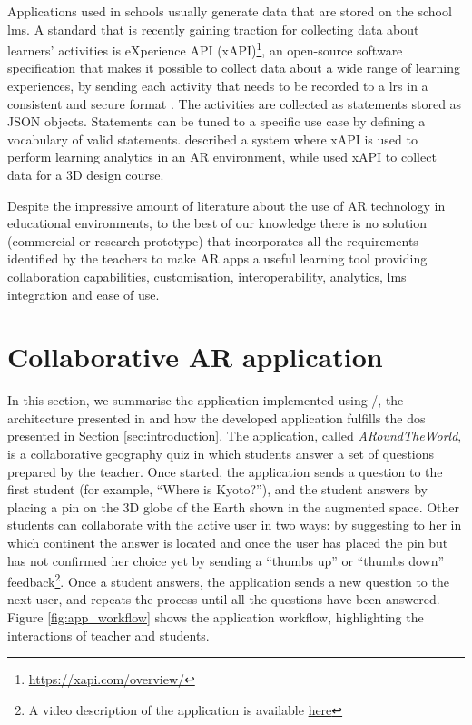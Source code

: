 \documentclass[pdflatex,sn-basic,iicol]{sn-jnl}%
\def\appname/{\textit{ARoundTheWorld}}
\begin{document}
Applications used in schools usually generate data that are stored on the school \gls{lms}. A standard that is recently gaining traction for collecting data about learners' activities is eXperience API (xAPI)\footnote{\url{https://xapi.com/overview/}}, an open-source software specification that makes it possible to collect data about a wide range of learning experiences, by sending each activity that needs to be recorded to a \gls{lrs} in a consistent and secure format \citep{xAPIspec}. The activities are collected as statements stored as JSON objects. Statements can be tuned to a specific use case by defining a vocabulary of valid statements. \cite{9225931} described a system where xAPI is used to perform learning analytics in an AR environment, while \cite{wu2020design} used xAPI to collect data for a 3D design course.

Despite the impressive amount of literature about the use of AR technology in educational environments, to the best of our knowledge there is no solution (commercial or research prototype) that incorporates all the requirements identified by the teachers to make AR apps a useful learning tool providing collaboration capabilities, customisation, interoperability, analytics, \gls{lms} integration and ease of use. 

\section{Collaborative AR application}\label{sec:appdesc}

In this section, we summarise the application implemented using \clear/, the architecture presented in \cite{Masneri2023} and how the developed application  fulfills the \gls{do}s presented in Section \ref{sec:introduction}. The application, called \appname/, is a collaborative geography quiz in which students answer a set of questions prepared by the teacher. Once started, the application sends a question to the first student (for example, ``Where is Kyoto?''), and the student answers by placing a pin on the 3D globe of the Earth shown in the augmented space. Other students can collaborate with the active user in two ways: by suggesting to her in which continent the answer is located and \textendash{} once the user has placed the pin but has not confirmed her choice yet \textendash{} by sending a ``thumbs up'' or ``thumbs down'' feedback\footnote{A video description of the application is available \href{https://anon.to/a7NPy8}{here}}. Once a student answers, the application sends a new question to the next user, and repeats the process until all the questions have been answered. Figure \ref{fig:app_workflow} shows the application workflow, highlighting the interactions of teacher and students.
\end{document}

